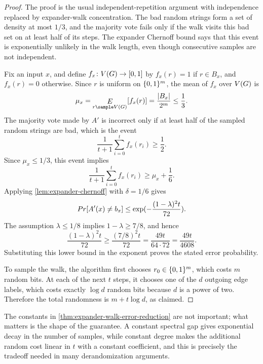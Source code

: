 \begin{proof}
	The proof is the usual independent-repetition argument with independence replaced by expander-walk concentration. The bad random strings form a set of density at most \(1/3\), and the majority vote fails only if the walk visits this bad set on at least half of its steps. The expander Chernoff bound says that this event is exponentially unlikely in the walk length, even though consecutive samples are not independent.

	Fix an input \(x\), and define \(f_x\colon V(G)\to[0,1]\) by \(f_x(r)=1\) if \(r\in B_x\), and \(f_x(r)=0\) otherwise. Since \(r\) is uniform on \(\{0,1\}^m\), the mean of \(f_x\) over \(V(G)\) is
	\begin{equation}
		\mu_x=\EE_{r\sample \Vertices(\Graph)}[f_x(r)]=\frac{\abs{B_x}}{2^m}\leq \frac{1}{3}.
	\end{equation}
	The majority vote made by \(A'\) is incorrect only if at least half of the sampled random strings are bad, which is the event
	\begin{equation}
		\frac{1}{t+1}\sum_{i=0}^t f_x(r_i)\geq \frac{1}{2}.
	\end{equation}
	Since \(\mu_x\leq 1/3\), this event implies
	\begin{equation}
		\frac{1}{t+1}\sum_{i=0}^t f_x(r_i)\geq \mu_x+\frac{1}{6}.
	\end{equation}
	Applying \cref{lem:expander-chernoff} with \(\delta=1/6\) gives
	\begin{equation}
		\Prob[A'(x)\neq b_x]
		\leq
		\exp\left(-\frac{(1-\lambda)^2t}{72}\right).
	\end{equation}
	The assumption \(\lambda\leq 1/8\) implies \(1-\lambda\geq 7/8\), and hence
	\begin{equation}
		\frac{(1-\lambda)^2t}{72}\geq \frac{(7/8)^2t}{72}=\frac{49t}{64\cdot 72}=\frac{49t}{4608}.
	\end{equation}
	Substituting this lower bound in the exponent proves the stated error probability.

	To sample the walk, the algorithm first chooses \(r_0\in\{0,1\}^m\), which costs \(m\) random bits. At each of the next \(t\) steps, it chooses one of the \(d\) outgoing edge labels, which costs exactly \(\log d\) random bits because \(d\) is a power of two. Therefore the total randomness is \(m+t\log d\), as claimed.
\end{proof}

The constants in \cref{thm:expander-walk-error-reduction} are not important; what matters is the shape of the guarantee. A constant spectral gap gives exponential decay in the number of samples, while constant degree makes the additional random cost linear in \(t\) with a constant coefficient, and this is precisely the tradeoff needed in many derandomization arguments.

